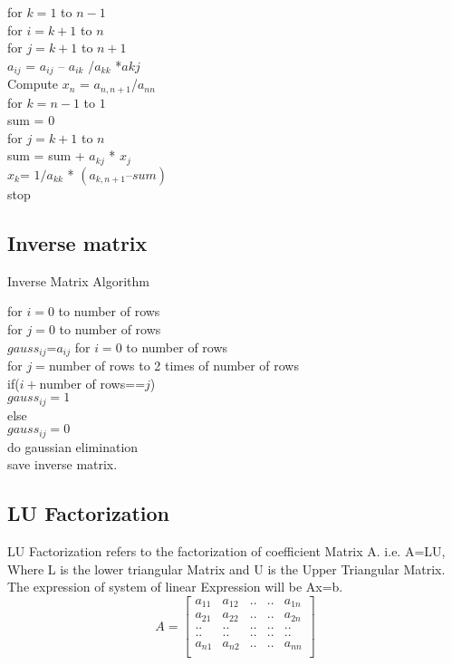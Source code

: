 \documentclass[a4paper, 10pt]{article}
\begin{document}
\begin{algorithm}[H]
\do for $k=1$ to $n-1$ {\\
\do for $i=k+1$ to $n$\\
\do for $j=k+1$ to $n+1$\\
$a_{ij}$ ={ $a_{ij}$ – $a_{ik}$} /$a_{kk}$ *$ a{kj}$\\ 
Compute $x_n$ = $a_{n,n+1}$/$a_{nn}$\\
}
\do for $k=n-1$ to $1$\\
sum = 0\\
\do for $j=k+1$ to $n$\\
sum = sum + $a_{kj}$ * $x_j$\\
$x_k $= $1/a_{kk}$ * $(a_{k,n+1} – sum)$\\
stop\\

\end{algorithm}

\subsection{Inverse matrix}
Inverse Matrix Algorithm\\
\begin{algorithm}[H]
\do for $i=0$ to number of rows\\
 \do for $j=0$ to number of rows\\
$gauss_{ij}$=$a_{ij}$ 
\do for $i=0$ to number of rows \\
 \do for $j=$number of rows to 2 times of number of rows\\
 if($i+$number of rows==$j$)\\
$gauss_{ij}=1$\\
else\\
$gauss_{ij}=0$\\
\do do gaussian elimination\\
save inverse matrix.

\end{algorithm}

\subsection{LU Factorization}

LU Factorization refers to the factorization of coefficient Matrix A.
	    i.e. A=LU, Where L is the lower triangular Matrix and U is the Upper Triangular Matrix.
The expression of system of linear Expression will be 
	Ax=b.
	\[
	A=
	  \begin{bmatrix}
	    a_{11} & a_{12} & .. & .. & a_{1n}\\
	    a_{21} & a_{22} & .. & .. & a_{2n}\\
	    .. & .. & .. & .. & ..\\
	    .. & .. & .. & .. & ..\\
	    a_{n1} & a_{n2} & .. & .. & a_{nn}\\
	  \end{bmatrix}
	\]
	
\end{document}
